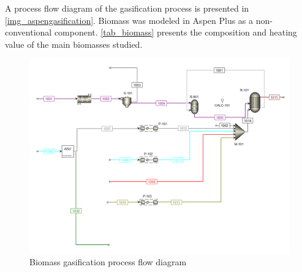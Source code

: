 \documentclass[a4paper, titlepage]{article}
\begin{document}
A process flow diagram of the gasification process is presented in \autoref{img_aspengasification}. Biomass was modeled
in Aspen Plus as a non-conventional component. \autoref{tab_biomass} presents the composition and heating value
of the main biomasses studied. 

\begin{figure}
	\includegraphics[width=\textwidth]{img/aspen_gasification.png}
	\caption{Biomass gasification process flow diagram}
	\label{img_aspengasification}
\end{figure}
\end{document}
